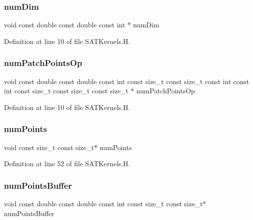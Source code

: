 \subsubsection{\texorpdfstring{num\+Dim}{numDim}}
{\footnotesize\ttfamily void const double const double const int $\ast$ num\+Dim}



Definition at line 10 of file S\+A\+T\+Kernels.\+H.

\hypertarget{SATKernels_8H_a673536f73773c14c18b2b8924543e4c1}{}\label{SATKernels_8H_a673536f73773c14c18b2b8924543e4c1} 
\subsubsection{\texorpdfstring{num\+Patch\+Points\+Op}{numPatchPointsOp}}
{\footnotesize\ttfamily void const double const double const int const size\+\_\+t const size\+\_\+t const int const int const size\+\_\+t const size\+\_\+t const size\+\_\+t $\ast$ num\+Patch\+Points\+Op}



Definition at line 10 of file S\+A\+T\+Kernels.\+H.

\hypertarget{SATKernels_8H_abc84d783b8a1ee234fdf7c43aef803e1}{}\label{SATKernels_8H_abc84d783b8a1ee234fdf7c43aef803e1} 
\subsubsection{\texorpdfstring{num\+Points}{numPoints}}
{\footnotesize\ttfamily void const size\+\_\+t const size\+\_\+t$\ast$ num\+Points}



Definition at line 52 of file S\+A\+T\+Kernels.\+H.

\hypertarget{SATKernels_8H_a763eadbfec63ff273e2d7b16b0b05974}{}\label{SATKernels_8H_a763eadbfec63ff273e2d7b16b0b05974} 
\subsubsection{\texorpdfstring{num\+Points\+Buffer}{numPointsBuffer}}
{\footnotesize\ttfamily void const double const double const int const size\+\_\+t const size\+\_\+t$\ast$ num\+Points\+Buffer}



